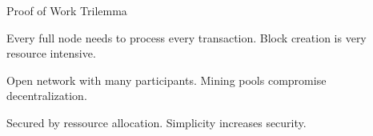 \documentclass[]{beamer}
\begin{document}
	\begin{frame}{Proof of Work Trilemma}
		\begin{center}
			\begin{tikzpicture}[scale=0.6, every node/.style ={scale=0.8}]
				
			\end{tikzpicture}
		\end{center}
		
		\begin{description}[labelwidth=10em]
			\item[\textbf{Scalability}] Every full node needs to process every transaction. Block creation is very resource intensive.
			\item[\textbf{Decentralization}] Open network with many participants. Mining pools compromise decentralization.
			\item[\textbf{Security}] Secured by ressource allocation. Simplicity increases security.
		\end{description}
	\end{frame}
	
\end{document}
